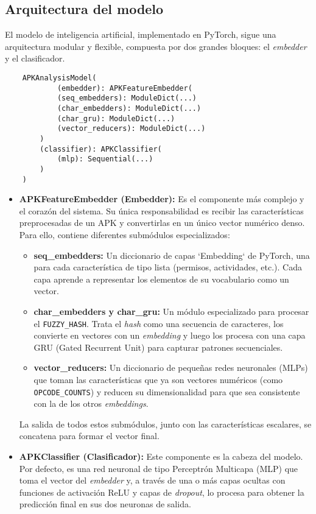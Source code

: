 \subsection*{Arquitectura del modelo}
El modelo de inteligencia artificial, implementado en PyTorch, sigue una arquitectura modular y flexible, compuesta por dos grandes bloques: el \textit{embedder} y el clasificador.

\begin{verbatim}
	APKAnalysisModel(
			(embedder): APKFeatureEmbedder(
			(seq_embedders): ModuleDict(...)
			(char_embedders): ModuleDict(...)
			(char_gru): ModuleDict(...)
			(vector_reducers): ModuleDict(...)
		)
		(classifier): APKClassifier(
			(mlp): Sequential(...)
		)
	)
\end{verbatim}

\begin{itemize}
	\item \textbf{APKFeatureEmbedder (Embedder):} Es el componente más complejo y el corazón del sistema. Su única responsabilidad es recibir las características preprocesadas de un APK y convertirlas en un único vector numérico denso. Para ello, contiene diferentes submódulos especializados:
	\begin{itemize}
		\item \textbf{seq\_embedders:} Un diccionario de capas `Embedding` de PyTorch, una para cada característica de tipo lista (permisos, actividades, etc.). Cada capa aprende a representar los elementos de su vocabulario como un vector.
		\item \textbf{char\_embedders y char\_gru:} Un módulo especializado para procesar el \texttt{FUZZY\_HASH}. Trata el \textit{hash} como una secuencia de caracteres, los convierte en vectores con un \textit{embedding} y luego los procesa con una capa GRU (Gated Recurrent Unit) para capturar patrones secuenciales.
		\item \textbf{vector\_reducers:} Un diccionario de pequeñas redes neuronales (MLPs) que toman las características que ya son vectores numéricos (como \texttt{OPCODE\_COUNTS}) y reducen su dimensionalidad para que sea consistente con la de los otros \textit{embeddings}.
	\end{itemize}
	La salida de todos estos submódulos, junto con las características escalares, se concatena para formar el vector final.
	
	\item \textbf{APKClassifier (Clasificador):} Este componente es la cabeza del modelo. Por defecto, es una red neuronal de tipo Perceptrón Multicapa (MLP) que toma el vector del \textit{embedder} y, a través de una o más capas ocultas con funciones de activación ReLU y capas de \textit{dropout}, lo procesa para obtener la predicción final en sus dos neuronas de salida.
\end{itemize}

